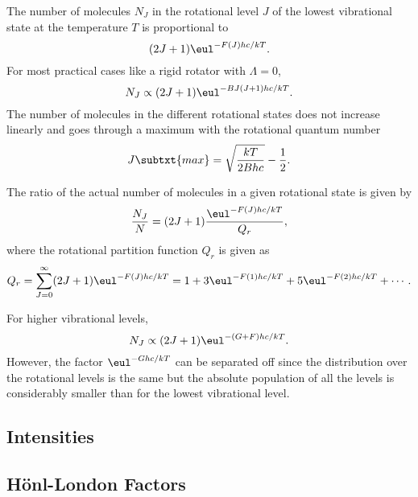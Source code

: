 The number of molecules $N_{J}$ in the rotational level $J$ of the lowest vibrational state at the temperature $T$ is proportional to
\begin{equation*}
    (2J + 1)\eul^{-F(J)hc/kT}.
\end{equation*}
For most practical cases like a rigid rotator with $\Lambda = 0$,
\begin{equation*}
    N_{J} \propto (2J + 1)\eul^{-BJ(J + 1)hc/kT}.
\end{equation*}
The number of molecules in the different rotational states does not increase linearly and goes through a maximum with the rotational quantum number
\begin{equation*}
    J\subtxt{max} = \sqrt{\frac{kT}{2Bhc}} - \frac{1}{2}.
\end{equation*}

The ratio of the actual number of molecules in a given rotational state is given by
\begin{equation*}
    \frac{N_{J}}{N} = (2J + 1)\frac{\eul^{-F(J)hc/kT}}{Q_{r}},
\end{equation*}
where the rotational partition function $Q_{r}$ is given as
\begin{equation}
    Q_{r} = \sum_{J=0}^{\infty}(2J + 1)\eul^{-F(J)hc/kT} = 1 + 3\eul^{-F(1)hc/kT} + 5\eul^{-F(2)hc/kT} + \dotsb.
\end{equation}

For higher vibrational levels,
\begin{equation}
    N_{J} \propto (2J + 1)\eul^{-(G + F)hc/kT}.
\end{equation}
However, the factor $\eul^{-Ghc/kT}$ can be separated off since the distribution over the rotational levels is the same but the absolute population of all the levels is considerably smaller than for the lowest vibrational level.

\subsection{Intensities}

\subsection{H\"onl-London Factors}

